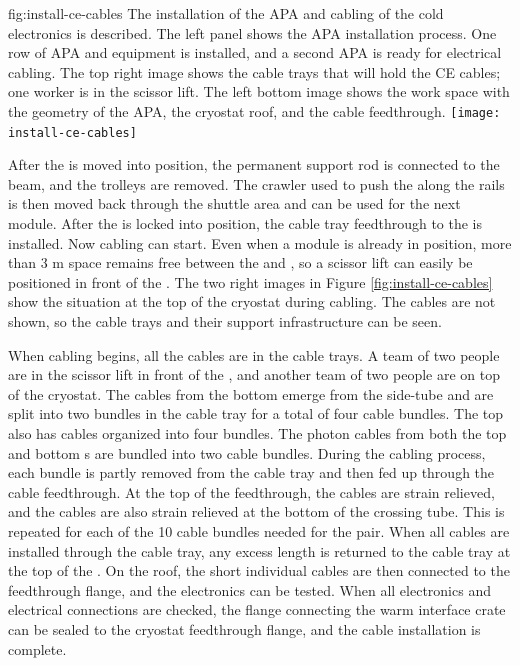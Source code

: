 \begin{dunefigure}{fig:install-ce-cables}
  {The installation of the APA and cabling of the cold electronics is described. The left panel shows the APA installation process. One row of APA and  equipment is installed, and a second APA is ready for electrical cabling. The top right image shows the cable trays that will hold the CE cables; one worker is in the scissor lift. The left bottom image shows the work space with the geometry of the APA, the cryostat roof, and the cable feedthrough.}
\texttt{[image: install-ce-cables]}
\end{dunefigure}

After the  is moved into position, the permanent support rod is connected to the  beam, and the trolleys are removed. 
The crawler used to push the  along the rails is then moved back through the shuttle area and can be used for the next module. 
After the  is locked into position, the cable tray feedthrough to the  is installed. Now  cabling can start. 
Even when a  module is already in position, more than 3 \si{m} space remains free between the  and , so a scissor lift can easily be positioned in front of the . 
The two right images in Figure \ref{fig:install-ce-cables} show the situation at the top of the cryostat during cabling. The cables are not shown, so the cable trays and their support infrastructure can be seen. 

When cabling begins, all the cables are in the cable trays. 
A team of two people are in the scissor lift in front of the , and another team of two people are on top of the cryostat. 
The  cables from the bottom  emerge from the  side-tube and are split into two bundles in the cable tray for a total of four cable bundles. 
The top  also has  cables organized into four bundles. 
The photon cables from both the top and bottom s are bundled into two cable bundles.
During the cabling process, each bundle is partly removed from the cable tray and then fed up through the cable feedthrough. 
At the top of the feedthrough, the cables are strain relieved, and the cables are also strain relieved at the bottom of the crossing tube.
This is repeated for each of the 10 cable bundles needed for the  pair. 
When all cables are installed through the cable tray, any excess length is returned to the cable tray at the top of the . 
On the roof, the short individual cables are then connected to the feedthrough flange, and the electronics can be tested. When all electronics and electrical connections are checked, the flange connecting the warm interface crate can be sealed to the cryostat feedthrough flange, and the cable installation is complete. 

